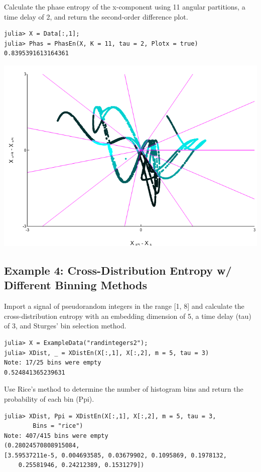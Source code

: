 \documentclass[12pt, a4paper, titlepage, openany]{book}
\begin{document}
Calculate the phase  entropy of the x-component using 11 angular partitions, a time delay of 2, and return the second-order difference plot.
\begin{verbatim}
julia> X = Data[:,1];
julia> Phas = PhasEn(X, K = 11, tau = 2, Plotx = true)
0.8395391613164361
\end{verbatim}
\includegraphics[scale=.5]{phasx2jl.png}


\newpage
\subsection{\normalsize Example 4: \hspace{15mm} Cross-Distribution Entropy w/ Different Binning Methods}
\noindent Import a signal of pseudorandom integers in the range [1, 8] and calculate the cross-distribution entropy with an embedding dimension of 5, a time delay (tau) of 3, and Sturges' bin selection method.
\begin{verbatim}
julia> X = ExampleData("randintegers2");
julia> XDist, _ = XDistEn(X[:,1], X[:,2], m = 5, tau = 3)
Note: 17/25 bins were empty
0.524841365239631
\end{verbatim}
Use Rice's method to determine the number of histogram bins and return the probability of each bin (Ppi).
\begin{verbatim}
julia> XDist, Ppi = XDistEn(X[:,1], X[:,2], m = 5, tau = 3, 
		Bins = "rice")
Note: 407/415 bins were empty
(0.28024570808915084, 
[3.59537211e-5, 0.004693585, 0.03679902, 0.1095869, 0.1978132,
    0.25581946, 0.24212389, 0.1531279])
\end{verbatim}
\end{document}
